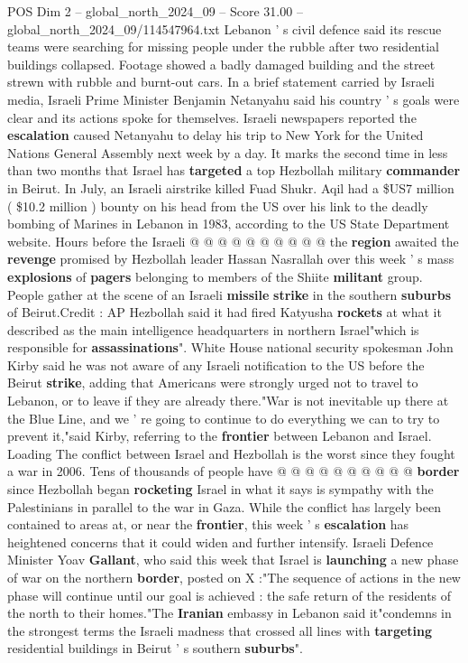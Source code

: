 \begin{textsample}{POS Dim 2 – global\_north\_2024\_09 – Score 31.00 – global\_north\_2024\_09/114547964.txt}
Lebanon ' s civil defence said its rescue teams were searching for missing people under the rubble after two residential buildings collapsed.
Footage showed a badly damaged building and the street strewn with rubble and burnt-out cars.
In a brief statement carried by Israeli media, Israeli Prime Minister Benjamin Netanyahu said his country ' s goals were clear and its actions spoke for themselves.
Israeli newspapers reported the \textbf{escalation} caused Netanyahu to delay his trip to New York for the United Nations General Assembly next week by a day.
It marks the second time in less than two months that Israel has \textbf{targeted} a top Hezbollah military \textbf{commander} in Beirut.
In July, an Israeli airstrike killed Fuad Shukr.
Aqil had a \$US7 million ( \$10.2 million ) bounty on his head from the US over his link to the deadly bombing of Marines in Lebanon in 1983, according to the US State Department website.
Hours before the Israeli @ @ @ @ @ @ @ @ @ @ the \textbf{region} awaited the \textbf{revenge} promised by Hezbollah leader Hassan Nasrallah over this week ' s mass \textbf{explosions} of \textbf{pagers} belonging to members of the Shiite \textbf{militant} group.
People gather at the scene of an Israeli \textbf{missile} \textbf{strike} in the southern \textbf{suburbs} of Beirut.Credit : AP Hezbollah said it had fired Katyusha \textbf{rockets} at what it described as the main intelligence headquarters in northern Israel"which is responsible for \textbf{assassinations}".
White House national security spokesman John Kirby said he was not aware of any Israeli notification to the US before the Beirut \textbf{strike}, adding that Americans were strongly urged not to travel to Lebanon, or to leave if they are already there."War is not inevitable up there at the Blue Line, and we ' re going to continue to do everything we can to try to prevent it,"said Kirby, referring to the \textbf{frontier} between Lebanon and Israel.
Loading The conflict between Israel and Hezbollah is the worst since they fought a war in 2006.
Tens of thousands of people have @ @ @ @ @ @ @ @ @ @ \textbf{border} since Hezbollah began \textbf{rocketing} Israel in what it says is sympathy with the Palestinians in parallel to the war in Gaza.
While the conflict has largely been contained to areas at, or near the \textbf{frontier}, this week ' s \textbf{escalation} has heightened concerns that it could widen and further intensify.
Israeli Defence Minister Yoav \textbf{Gallant}, who said this week that Israel is \textbf{launching} a new phase of war on the northern \textbf{border}, posted on X :"The sequence of actions in the new phase will continue until our goal is achieved : the safe return of the residents of the north to their homes."The \textbf{Iranian} embassy in Lebanon said it"condemns in the strongest terms the Israeli madness that crossed all lines with \textbf{targeting} residential buildings in Beirut ' s southern \textbf{suburbs}".

\end{textsample}
